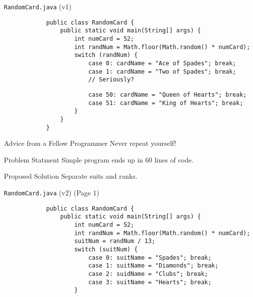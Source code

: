 \documentclass[10pt, compress]{beamer}
\begin{document}
\begin{slide}
	\begin{block}{\texttt{RandomCard.java} (v1)}
		\begin{verbatim}
			public class RandomCard {
			    public static void main(String[] args) {
			        int numCard = 52;
			        int randNum = Math.floor(Math.random() * numCard);
			        switch (randNum) {
			            case 0: cardName = "Ace of Spades"; break;
			            case 1: cardName = "Two of Spades"; break;
			            // Seriously?
		\end{verbatim}
		\begin{verbatim}
			            case 50: cardName = "Queen of Hearts"; break;
			            case 51: cardName = "King of Hearts"; break;
			        }
			    }
			}
		\end{verbatim}
	\end{block}
\end{slide}

\begin{slide}
	\begin{block}{Advice from a Fellow Programmer}
		Never repeat yourself!
	\end{block}
	\begin{block}{Problem Statment}
		Simple program ends up in 60 lines of code.
	\end{block}
	\begin{block}{Proposed Solution}
		Separate suits and ranks.
	\end{block}
\end{slide}

\begin{slide}
	\begin{block}{\texttt{RandomCard.java} (v2) (Page 1)}
		\begin{verbatim}
			public class RandomCard {
			    public static void main(String[] args) {
			        int numCard = 52;
			        int randNum = Math.floor(Math.random() * numCard);
			        suitNum = randNum / 13;
			        switch (suitNum) {
			            case 0: suitName = "Spades"; break;
			            case 1: suitName = "Diamonds"; break;
			            case 2: suidName = "Clubs"; break;
			            case 3: suitName = "Hearts"; break;
			        }
		\end{verbatim}
	\end{block}
\end{slide}
\end{document}
